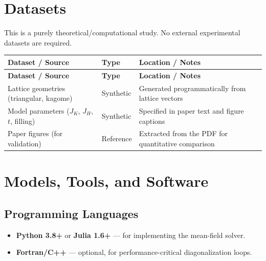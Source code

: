 \documentclass[11pt,a4paper]{article}
\begin{document}
\section{Datasets}
This is a purely theoretical/computational study. No external experimental datasets are required.

\begin{longtable}{p{4.5cm} p{3.5cm} p{6cm}}
\toprule
\textbf{Dataset / Source} & \textbf{Type} & \textbf{Location / Notes} \\
\midrule
\endfirsthead
\toprule
\textbf{Dataset / Source} & \textbf{Type} & \textbf{Location / Notes} \\
\midrule
\endhead
Lattice geometries (triangular, kagome) & Synthetic & Generated programmatically from lattice vectors \\
\midrule
Model parameters ($J_K$, $J_H$, $t$, filling) & Synthetic & Specified in paper text and figure captions \\
\midrule
Paper figures (for validation) & Reference & Extracted from the PDF for quantitative comparison \\
\bottomrule
\end{longtable}

\section{Models, Tools, and Software}

\subsection{Programming Languages}
\begin{itemize}
  \item \textbf{Python 3.8+} or \textbf{Julia 1.6+} --- for implementing the mean-field solver.
  \item \textbf{Fortran/C++} --- optional, for performance-critical diagonalization loops.
\end{itemize}
\end{document}
